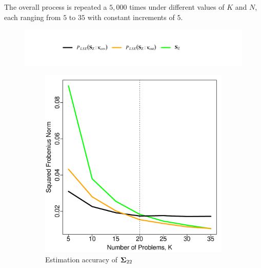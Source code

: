 \documentclass[11pt]{article}
\theoremstyle{definition}
\theoremstyle{definition}
\def\bSigma{{\bf \Sigma}}
\begin{document}
The overall process is repeated a $5,000$ times under different values of $K$ and $N$, each ranging from $5$ to $35$ with constant increments of $5$. 


\begin{figure}[t!]
\vspace{-2em}
\centering
\hspace*{1em} 	\includegraphics{legendSim.pdf} %
\vspace{-4em}

        \begin{subfigure}{0.5\textwidth}
                \includegraphics[width=\textwidth]{simResSigma.pdf}
                \caption{Estimation accuracy of $\bSigma_{22}$}
                \label{Sigma}
        \end{subfigure}%
        \begin{subfigure}{0.5\textwidth}

\end{subfigure}
\end{figure}
\end{document}
